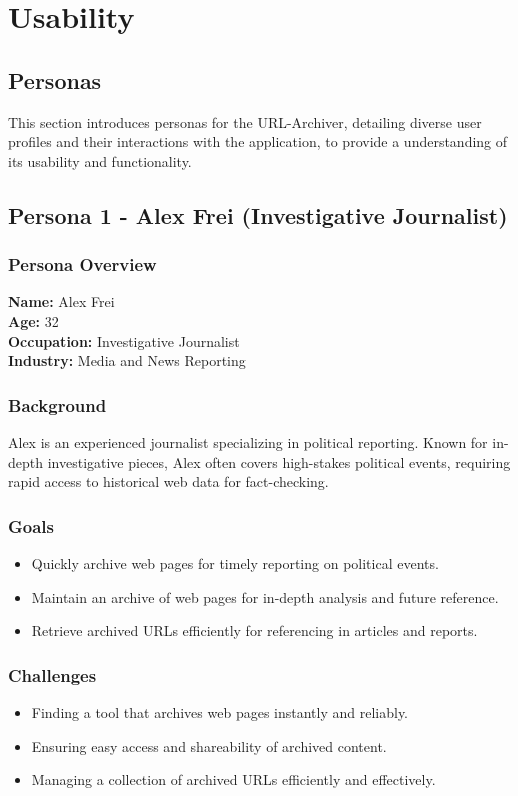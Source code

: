 \section{Usability}

\subsection{Personas}
This section introduces personas for the URL-Archiver, detailing diverse user profiles and their interactions with the application, to provide a understanding of its usability and functionality.

\subsection{Persona 1 - Alex Frei (Investigative Journalist)}

\subsubsection{Persona Overview}

\textbf{Name:} Alex Frei \\
\textbf{Age:} 32 \\
\textbf{Occupation:} Investigative Journalist \\
\textbf{Industry:} Media and News Reporting

\subsubsection{Background}
Alex is an experienced journalist specializing in political reporting.
Known for in-depth investigative pieces, Alex often covers high-stakes political events, requiring rapid access to historical web data for fact-checking.

\subsubsection{Goals}
\begin{itemize}
    \item Quickly archive web pages for timely reporting on political events.
    \item Maintain an archive of web pages for in-depth analysis and future reference.
    \item Retrieve archived URLs efficiently for referencing in articles and reports.
\end{itemize}

\subsubsection{Challenges}
\begin{itemize}
    \item Finding a tool that archives web pages instantly and reliably.
    \item Ensuring easy access and shareability of archived content.
    \item Managing a collection of archived URLs efficiently and effectively.
\end{itemize}

